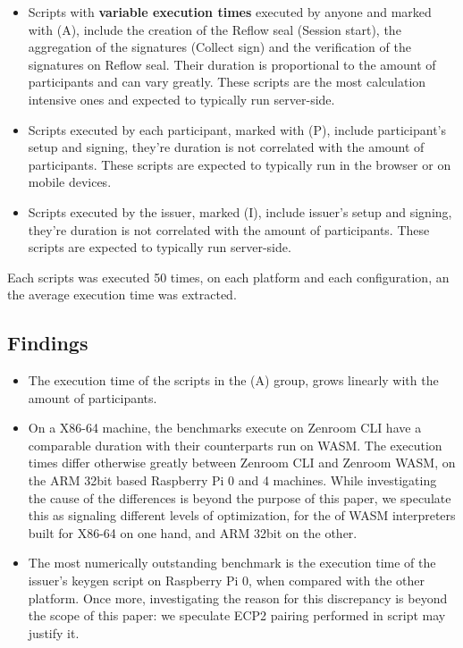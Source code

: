 \documentclass[twocolumn]{article}
\begin{document}
\begin{itemize}
\item Scripts with \textbf{variable execution times} executed by anyone and marked with (A), include the creation of the Reflow seal (Session start), the aggregation of the signatures (Collect sign) and the verification of the signatures on Reflow seal. Their duration is proportional to the amount of participants and can vary greatly. These scripts are the most calculation intensive ones and expected to typically run server-side.

\item Scripts executed by each participant, marked with (P), include participant's setup and signing, they're duration is not correlated with the amount of participants. These scripts are expected to typically run in the browser or on mobile devices.

\item Scripts executed by the issuer, marked (I), include issuer's setup and signing, they're duration is not correlated with the amount of participants. These scripts are expected to typically run server-side.
\end{itemize}

Each scripts was executed 50 times, on each platform and each configuration, an the average execution time was extracted.



\subsection*{Findings}

\begin{itemize}
\item The execution time of the scripts in the (A) group, grows linearly with the amount of participants. 

\item On a X86-64 machine, the benchmarks execute on Zenroom CLI have a comparable duration with their counterparts run on WASM. The execution times differ otherwise greatly between Zenroom CLI and Zenroom WASM, on the ARM 32bit based Raspberry Pi 0 and 4 machines. 
While investigating the cause of the differences is beyond the purpose of this paper, we speculate this as signaling different levels of optimization, for the of WASM interpreters built for X86-64 on one hand, and ARM 32bit on the other.  

\item The most numerically outstanding benchmark is the execution time of the issuer's keygen script on Raspberry Pi 0, when compared with the other platform. Once more, investigating the reason for this discrepancy is beyond the scope of this paper: we speculate ECP2 pairing performed in script may justify it.
\end{itemize}
\end{document}
